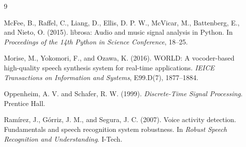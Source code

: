 \documentclass[11pt,a4paper]{article}
\begin{document}
\begin{thebibliography}{9}

McFee, B., Raffel, C., Liang, D., Ellis, D. P. W., McVicar, M., Battenberg, E., and Nieto, O. (2015).
\newblock librosa: Audio and music signal analysis in Python.
\newblock In \emph{Proceedings of the 14th Python in Science Conference}, 18--25.

Morise, M., Yokomori, F., and Ozawa, K. (2016).
\newblock WORLD: A vocoder-based high-quality speech synthesis system for real-time applications.
\newblock \emph{IEICE Transactions on Information and Systems}, E99.D(7), 1877--1884.

Oppenheim, A. V. and Schafer, R. W. (1999).
\newblock \emph{Discrete-Time Signal Processing}.
\newblock Prentice Hall.

Ram\'irez, J., G\'orriz, J. M., and Segura, J. C. (2007).
\newblock Voice activity detection. Fundamentals and speech recognition system robustness.
\newblock In \emph{Robust Speech Recognition and Understanding}. I-Tech.

\end{thebibliography}
\end{document}
